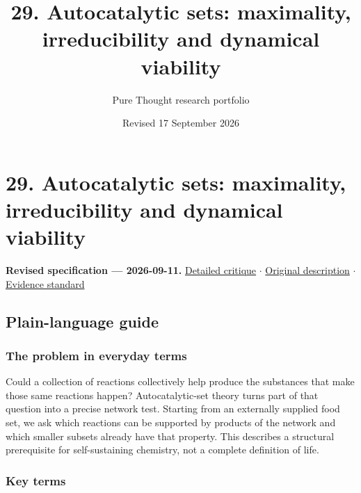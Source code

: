 \documentclass[
  11pt,
]{article}
\title{29. Autocatalytic sets: maximality, irreducibility and dynamical
viability}
\author{Pure Thought research portfolio}
\date{Revised 17 September 2026}
\begin{document}
\maketitle
\thispagestyle{empty}
\clearpage

\section{29. Autocatalytic sets: maximality, irreducibility and
dynamical viability}

\textbf{Revised specification --- 2026-09-11.}
\href{https://github.com/rick-stevens-ai/Pure-Thought/blob/main/reviews/29-Chemical-Reaction-Networks-Origins.md}{Detailed
critique} \ensuremath{\cdot}
\href{https://github.com/rick-stevens-ai/Pure-Thought/blob/main/archive/original-PRDs/29-Chemical-Reaction-Networks-Origins.md}{Original
description} \ensuremath{\cdot}
\href{https://github.com/rick-stevens-ai/Pure-Thought/blob/main/reviews/EVIDENCE-STANDARD.md}{Evidence
standard}

\subsection{Plain-language guide}

\subsubsection{The problem in everyday terms}

Could a collection of reactions collectively help produce the substances
that make those same reactions happen? Autocatalytic-set theory turns
part of that question into a precise network test. Starting from an
externally supplied food set, we ask which reactions can be supported by
products of the network and which smaller subsets already have that
property. This describes a structural prerequisite for self-sustaining
chemistry, not a complete definition of life.

\subsubsection{Key terms}
\end{document}
